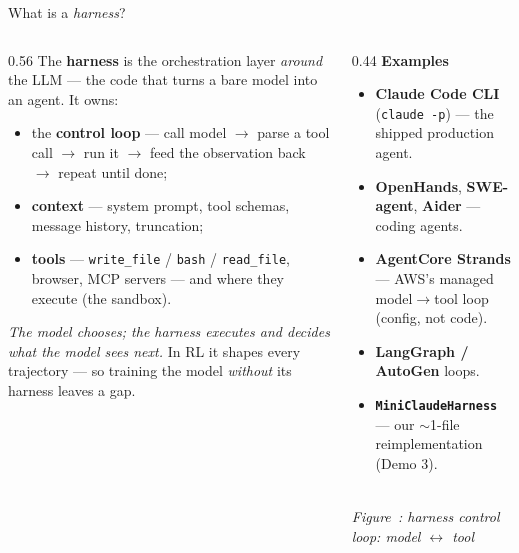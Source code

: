 \documentclass[aspectratio=169]{beamer}
\newcounter{deckfig}
\newcommand{\figtag}[1]{\refstepcounter{deckfig}%
  {\scriptsize\itshape Figure~\thedeckfig: #1}}
\begin{document}
\begin{frame}{What is a \emph{harness}?}
  \begin{columns}[T]
    \begin{column}{0.56\textwidth}
      \footnotesize The \textbf{harness} is the orchestration layer \emph{around} the LLM --- the
      code that turns a bare model into an agent. It owns:
      \begin{itemize}\setlength\itemsep{0.2em}
        \item the \textbf{control loop} --- call model $\to$ parse a tool call $\to$ run it $\to$
          feed the observation back $\to$ repeat until done;
        \item \textbf{context} --- system prompt, tool schemas, message history, truncation;
        \item \textbf{tools} --- \texttt{write\_file} / \texttt{bash} / \texttt{read\_file}, browser,
          MCP servers --- and where they execute (the sandbox).
      \end{itemize}
      \vspace{0.3em}
      \emph{The model chooses; the harness executes and decides what the model sees next.} In RL it
      shapes every trajectory --- so training the model \emph{without} its harness leaves a gap.
    \end{column}
    \begin{column}{0.44\textwidth}
      \textbf{Examples}
      \begin{itemize}\setlength\itemsep{0.15em}
        \footnotesize
        \item \textbf{Claude Code CLI} (\texttt{claude -p}) --- the shipped production agent.
        \item \textbf{OpenHands}, \textbf{SWE-agent}, \textbf{Aider} --- coding agents.
        \item \textbf{AgentCore Strands} --- AWS's managed model$\to$tool loop (config, not code).
        \item \textbf{LangGraph / AutoGen} loops.
        \item \textbf{\texttt{MiniClaudeHarness}} --- our $\sim$1-file reimplementation (Demo 3).
      \end{itemize}
      \vspace{0.1em}
      \centering
      \\[0.05em]\figtag{harness control loop: model $\leftrightarrow$ tool}
    \end{column}
  \end{columns}
\end{frame}
\end{document}
